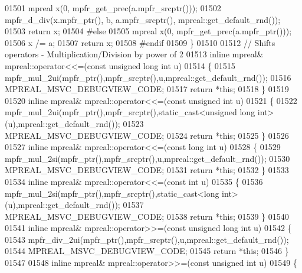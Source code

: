 \begin{DoxyCode}
01501     mpreal x(0, mpfr\_get\_prec(a.mpfr\_srcptr()));
01502     mpfr\_d\_div(x.mpfr\_ptr(), b, a.mpfr\_srcptr(), mpreal::get\_default\_rnd());
01503     \textcolor{keywordflow}{return} x;
01504 \textcolor{preprocessor}{#else}
01505     mpreal x(0, mpfr\_get\_prec(a.mpfr\_ptr()));
01506     x /= a;
01507     \textcolor{keywordflow}{return} x;
01508 \textcolor{preprocessor}{#endif}
01509 \}
01510 
01512 \textcolor{comment}{// Shifts operators - Multiplication/Division by power of 2}
01513 \textcolor{keyword}{inline} mpreal& mpreal::operator<<=(\textcolor{keyword}{const} \textcolor{keywordtype}{unsigned} \textcolor{keywordtype}{long} \textcolor{keywordtype}{int} u)
01514 \{
01515     mpfr\_mul\_2ui(mpfr\_ptr(),mpfr\_srcptr(),u,mpreal::get\_default\_rnd());
01516     MPREAL\_MSVC\_DEBUGVIEW\_CODE;
01517     \textcolor{keywordflow}{return} *\textcolor{keyword}{this};
01518 \}
01519 
01520 \textcolor{keyword}{inline} mpreal& mpreal::operator<<=(\textcolor{keyword}{const} \textcolor{keywordtype}{unsigned} \textcolor{keywordtype}{int} u)
01521 \{
01522     mpfr\_mul\_2ui(mpfr\_ptr(),mpfr\_srcptr(),static\_cast<unsigned long int>(u),mpreal::get\_default\_rnd());
01523     MPREAL\_MSVC\_DEBUGVIEW\_CODE;
01524     \textcolor{keywordflow}{return} *\textcolor{keyword}{this};
01525 \}
01526 
01527 \textcolor{keyword}{inline} mpreal& mpreal::operator<<=(\textcolor{keyword}{const} \textcolor{keywordtype}{long} \textcolor{keywordtype}{int} u)
01528 \{
01529     mpfr\_mul\_2si(mpfr\_ptr(),mpfr\_srcptr(),u,mpreal::get\_default\_rnd());
01530     MPREAL\_MSVC\_DEBUGVIEW\_CODE;
01531     \textcolor{keywordflow}{return} *\textcolor{keyword}{this};
01532 \}
01533 
01534 \textcolor{keyword}{inline} mpreal& mpreal::operator<<=(\textcolor{keyword}{const} \textcolor{keywordtype}{int} u)
01535 \{
01536     mpfr\_mul\_2si(mpfr\_ptr(),mpfr\_srcptr(),static\_cast<long int>(u),mpreal::get\_default\_rnd());
01537     MPREAL\_MSVC\_DEBUGVIEW\_CODE;
01538     \textcolor{keywordflow}{return} *\textcolor{keyword}{this};
01539 \}
01540 
01541 \textcolor{keyword}{inline} mpreal& mpreal::operator>>=(\textcolor{keyword}{const} \textcolor{keywordtype}{unsigned} \textcolor{keywordtype}{long} \textcolor{keywordtype}{int} u)
01542 \{
01543     mpfr\_div\_2ui(mpfr\_ptr(),mpfr\_srcptr(),u,mpreal::get\_default\_rnd());
01544     MPREAL\_MSVC\_DEBUGVIEW\_CODE;
01545     \textcolor{keywordflow}{return} *\textcolor{keyword}{this};
01546 \}
01547 
01548 \textcolor{keyword}{inline} mpreal& mpreal::operator>>=(\textcolor{keyword}{const} \textcolor{keywordtype}{unsigned} \textcolor{keywordtype}{int} u)
01549 \{

\end{DoxyCode}
